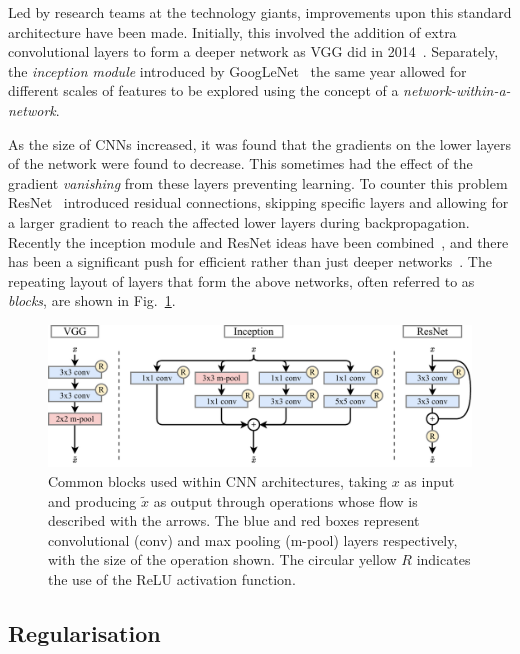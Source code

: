Led by research teams at the technology giants, improvements upon this standard architecture have
been made. Initially, this involved the addition of extra convolutional layers to form a deeper
network as VGG did in 2014~\cite{simonyan2014}. Separately, the \emph{inception module} introduced
by GoogLeNet~\cite{szegedy2015} the same year allowed for different scales of features to be
explored using the concept of a \emph{network-within-a-network}.

As the size of CNNs increased, it was found that the gradients on the lower layers of the network
were found to decrease. This sometimes had the effect of the gradient \emph{vanishing} from these
layers preventing learning. To counter this problem ResNet~\cite{he2016_original, he2016_improved}
introduced residual connections, skipping specific layers and allowing for a larger gradient to
reach the affected lower layers during backpropagation. Recently the inception module and ResNet
ideas have been combined~\cite{szegedy2016}, and there has been a significant push for efficient
rather than just deeper networks~\cite{sandler2018,tan2019}. The repeating layout of layers that
form the above networks, often referred to as \emph{blocks}, are shown in Fig.~\ref{fig:blocks}.

\begin{figure} %
    \includegraphics[width=\textwidth]{diagrams/6-cnn/blocks.pdf}
    \caption[Common Convolutional Neural Network architecture blocks]
    {Common blocks used within CNN architectures, taking $x$ as input and producing $\tilde{x}$ as
        output through operations whose flow is described with the arrows. The blue and red boxes
        represent convolutional (conv) and max pooling (m-pool) layers respectively, with the size
        of the operation shown. The circular yellow $R$ indicates the use of the ReLU activation
        function.}
    \label{fig:blocks}
\end{figure}

\subsection{Regularisation} %
\label{sec:cnn_theory_reg} %

